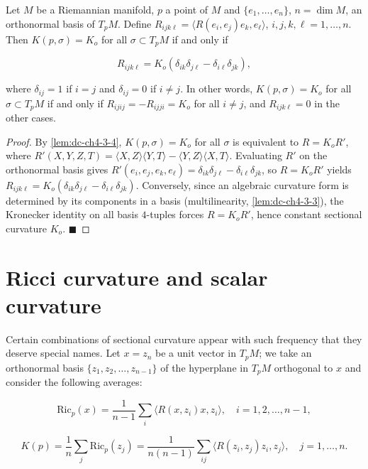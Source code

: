 \begin{corollary}
  \label{cor:dc-ch4-3-5}
  \leanok
  Let $M$ be a Riemannian manifold, $p$ a point of $M$ and $\{e_1,\dots,e_n\}$,
  $n=\dim M$, an orthonormal basis of $T_pM$. Define
  $R_{ijk\ell}=\langle R(e_i,e_j)e_k,e_\ell\rangle$, $i,j,k,\ell=1,\dots,n$. Then
  $K(p,\sigma)=K_o$ for all $\sigma\subset T_pM$ if and only if
  
  $$
  R_{ijk\ell}=K_o(\delta_{ik}\delta_{j\ell}-\delta_{i\ell}\delta_{jk}),
  $$
  
  where $\delta_{ij}=1$ if $i=j$ and $\delta_{ij}=0$ if $i\neq j$. In other words,
  $K(p,\sigma)=K_o$ for all $\sigma\subset T_pM$ if and only if
  $R_{ijij}=-R_{ijji}=K_o$ for all $i\neq j$, and $R_{ijk\ell}=0$ in the other
  cases.
\end{corollary}
\begin{proof}
  \leanok
  By \cref{lem:dc-ch4-3-4}, $K(p,\sigma)=K_o$ for all $\sigma$ is equivalent to
  $R=K_oR'$, where $R'(X,Y,Z,T)=\langle X,Z\rangle\langle Y,T\rangle-\langle
  Y,Z\rangle\langle X,T\rangle$. Evaluating $R'$ on the orthonormal basis gives
  $R'(e_i,e_j,e_k,e_\ell)=\delta_{ik}\delta_{j\ell}-\delta_{i\ell}\delta_{jk}$,
  so $R=K_oR'$ yields
  $R_{ijk\ell}=K_o(\delta_{ik}\delta_{j\ell}-\delta_{i\ell}\delta_{jk})$.
  Conversely, since an algebraic curvature form is determined by its components
  in a basis (multilinearity, \cref{lem:dc-ch4-3-3}), the Kronecker identity on
  all basis $4$-tuples forces $R=K_oR'$, hence constant sectional curvature
  $K_o$. $\blacksquare$
\end{proof}

\section{Ricci curvature and scalar curvature}

Certain combinations of sectional curvature appear with such frequency that they
deserve special names. Let $x=z_n$ be a unit vector in $T_pM$; we take an
orthonormal basis $\{z_1,z_2,\dots,z_{n-1}\}$ of the hyperplane in $T_pM$
orthogonal to $x$ and consider the following averages:

$$
\mathrm{Ric}_p(x)=\frac{1}{n-1}\sum_i\langle R(x,z_i)x,z_i\rangle,\quad i=1,2,\dots,n-1,
$$

$$
K(p)=\frac{1}{n}\sum_j\mathrm{Ric}_p(z_j)=\frac{1}{n(n-1)}\sum_{ij}\langle R(z_i,z_j)z_i,z_j\rangle,\quad j=1,\dots,n.
$$

